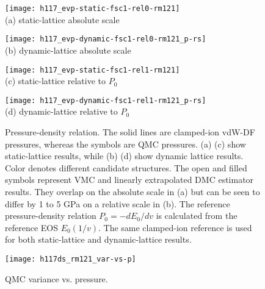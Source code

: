 \begin{figure}[h]
\centering
\begin{minipage}{0.49\textwidth}
\centering
\texttt{[image: h117\_evp-static-fsc1-rel0-rm121]}\\
(a) static-lattice absolute scale
\end{minipage}
\begin{minipage}{0.49\textwidth}
\centering
\texttt{[image: h117\_evp-dynamic-fsc1-rel0-rm121\_p-rs]}\\
(b) dynamic-lattice absolute scale
\end{minipage}
\begin{minipage}{0.49\textwidth}
\centering
\texttt{[image: h117\_evp-static-fsc1-rel1-rm121]}\\
(c) static-lattice relative to $P_0$
\end{minipage}
\begin{minipage}{0.49\textwidth}
\centering
\texttt{[image: h117\_evp-dynamic-fsc1-rel1-rm121\_p-rs]}\\
(d) dynamic-lattice relative to $P_0$
\end{minipage}
\caption{Pressure-density relation. The solid lines are clamped-ion vdW-DF pressures, whereas the symbols are QMC pressures. (a) (c) show static-lattice results, while (b) (d) show dynamic lattice results. Color denotes different candidate structures. The open and filled symbols represent VMC and linearly extrapolated DMC estimator results. They overlap on the absolute scale in (a) but can be seen to differ by 1 to 5 GPa on a relative scale in (b). The reference pressure-density relation $P_0=-dE_0/dv$ is calculated from the reference EOS $E_0(1/v)$. The same clamped-ion reference is used for both static-lattice and dynamic-lattice results.}
\label{fig:hsolid-p-vs-n}
\end{figure}

\begin{figure}[h]
\centering
\begin{minipage}{0.49\linewidth}
\centering
\texttt{[image: h117ds\_rm121\_var-vs-p]}
\end{minipage}
\caption{QMC variance vs. pressure.}
\label{fig:hsolid-v-vs-p}
\end{figure}


